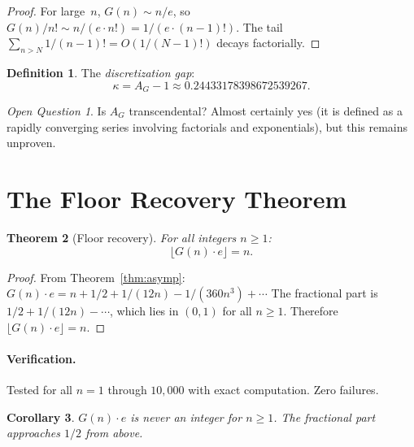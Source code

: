 \documentclass[11pt,a4paper]{article}
\newtheorem{theorem}{Theorem}[section]
\newtheorem{corollary}[theorem]{Corollary}
\theoremstyle{definition}
\newtheorem{definition}[theorem]{Definition}
\theoremstyle{remark}
\newtheorem{openquestion}{Open Question}
\newcommand{\AG}{A_G}
\newcommand{\floor}[1]{\lfloor #1 \rfloor}
\begin{document}
\begin{proof}
For large~$n$, $G(n)\sim n/e$, so $G(n)/n!\sim n/(e\cdot n!)=1/(e\cdot(n-1)!)$. The tail $\sum_{n>N}1/(n-1)!=O(1/(N-1)!)$ decays factorially.
\end{proof}

\begin{definition}\label{def:kappa}
The \emph{discretization gap}:
\begin{equation}\label{eq:kappa}
  \kappa = \AG - 1 \approx 0.24433178398672539267.
\end{equation}
\end{definition}

\begin{openquestion}\label{oq:trans}
Is $\AG$ transcendental? Almost certainly yes (it is defined as a rapidly converging series involving factorials and exponentials), but this remains unproven.
\end{openquestion}

\section{The Floor Recovery Theorem}\label{sec:floor}

\begin{theorem}[Floor recovery]\label{thm:floor}
For all integers $n \ge 1$:
\begin{equation}\label{eq:floor}
  \floor{G(n)\cdot e} = n.
\end{equation}
\end{theorem}

\begin{proof}
From Theorem~\ref{thm:asymp}: $G(n)\cdot e = n + 1/2 + 1/(12n) - 1/(360n^{3})+\cdots$ The fractional part is $1/2 + 1/(12n) - \cdots$, which lies in $(0,1)$ for all $n\ge 1$. Therefore $\floor{G(n)\cdot e}=n$.
\end{proof}

\paragraph{Verification.} Tested for all $n=1$ through $10{,}000$ with exact computation. Zero failures.

\begin{corollary}\label{cor:nonint}
$G(n)\cdot e$ is never an integer for $n\ge 1$. The fractional part approaches $1/2$ from above.
\end{corollary}
\end{document}
